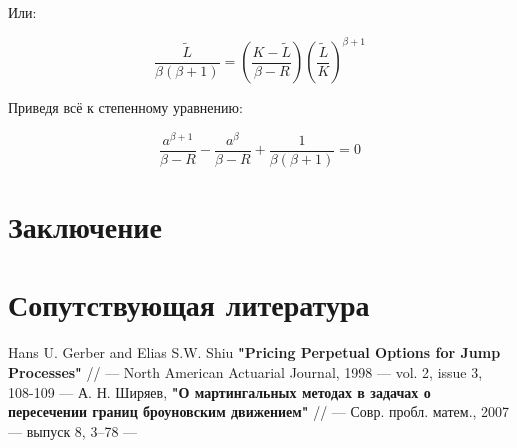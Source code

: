 \documentclass[a4paper,12pt]{article}
\theoremstyle{definition}
\begin{document}
Или:

\begin{equation*}
    \frac{\tilde{L}}{\beta (\beta + 1)} = \left( \frac{K - \tilde{L}}{\beta - R} \right) \left( \frac{\tilde{L}}{K} \right)^{\beta + 1}
\end{equation*}

Приведя всё к степенному уравнению:

\begin{equation*}
    \frac{a^{\beta + 1}}{\beta - R} - \frac{a^{\beta}}{\beta - R} + \frac{1}{\beta (\beta + 1)} = 0
\end{equation*}

\section{Заключение}

\section{Сопутствующая литература}

\begin{thebibliography}{3}
Hans U. Gerber and Elias S.W. Shiu \textbf{"Pricing Perpetual Options for Jump Processes"} // --- North American Actuarial Journal, 1998 --- vol. 2, issue 3, 108-109 ---
А. Н. Ширяев, \textbf{"О мартингальных методах в задачах о пересечении границ броуновским движением"} // --- Совр. пробл. матем., 2007 --- выпуск 8, 3–78 ---
\end{thebibliography}

\appendix
\end{document}
